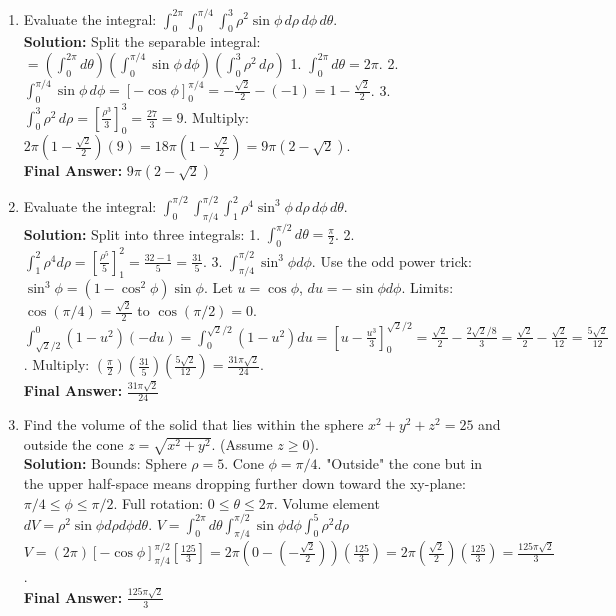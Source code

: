 \documentclass[11pt]{article}
\begin{document}
\begin{enumerate}[label=\textbf{\arabic*.}]
\item Evaluate the integral: $\int_0^{2\pi} \int_0^{\pi/4} \int_0^3 \rho^2 \sin\phi \, d\rho \, d\phi \, d\theta$.\\
\textbf{Solution:} Split the separable integral:
$= \left( \int_0^{2\pi} d\theta \right) \left( \int_0^{\pi/4} \sin\phi \, d\phi \right) \left( \int_0^3 \rho^2 \, d\rho \right)$
1. $\int_0^{2\pi} d\theta = 2\pi$.
2. $\int_0^{\pi/4} \sin\phi \, d\phi = [-\cos\phi]_0^{\pi/4} = -\frac{\sqrt{2}}{2} - (-1) = 1 - \frac{\sqrt{2}}{2}$.
3. $\int_0^3 \rho^2 \, d\rho = [\frac{\rho^3}{3}]_0^3 = \frac{27}{3} = 9$.
Multiply: $2\pi \left(1 - \frac{\sqrt{2}}{2}\right) (9) = 18\pi(1 - \frac{\sqrt{2}}{2}) = 9\pi(2-\sqrt{2})$.\\
\textbf{Final Answer:} $9\pi(2-\sqrt{2})$

\item Evaluate the integral: $\int_0^{\pi/2} \int_{\pi/4}^{\pi/2} \int_1^2 \rho^4 \sin^3\phi \, d\rho \, d\phi \, d\theta$.\\
\textbf{Solution:} Split into three integrals:
1. $\int_0^{\pi/2} d\theta = \frac{\pi}{2}$.
2. $\int_1^2 \rho^4 d\rho = [\frac{\rho^5}{5}]_1^2 = \frac{32-1}{5} = \frac{31}{5}$.
3. $\int_{\pi/4}^{\pi/2} \sin^3\phi d\phi$. Use the odd power trick: $\sin^3\phi = (1-\cos^2\phi)\sin\phi$. Let $u=\cos\phi$, $du=-\sin\phi d\phi$. Limits: $\cos(\pi/4) = \frac{\sqrt{2}}{2}$ to $\cos(\pi/2) = 0$.
$\int_{\sqrt{2}/2}^0 (1-u^2)(-du) = \int_0^{\sqrt{2}/2} (1-u^2)du = [u - \frac{u^3}{3}]_0^{\sqrt{2}/2} = \frac{\sqrt{2}}{2} - \frac{2\sqrt{2}/8}{3} = \frac{\sqrt{2}}{2} - \frac{\sqrt{2}}{12} = \frac{5\sqrt{2}}{12}$.
Multiply: $(\frac{\pi}{2}) (\frac{31}{5}) (\frac{5\sqrt{2}}{12}) = \frac{31\pi\sqrt{2}}{24}$.\\
\textbf{Final Answer:} $\frac{31\pi\sqrt{2}}{24}$

\item Find the volume of the solid that lies within the sphere $x^2+y^2+z^2=25$ and outside the cone $z=\sqrt{x^2+y^2}$. (Assume $z \ge 0$).\\
\textbf{Solution:} 
Bounds: Sphere $\rho = 5$. Cone $\phi = \pi/4$. "Outside" the cone but in the upper half-space means dropping further down toward the xy-plane: $\pi/4 \le \phi \le \pi/2$. Full rotation: $0 \le \theta \le 2\pi$. Volume element $dV = \rho^2\sin\phi d\rho d\phi d\theta$.
$V = \int_0^{2\pi} d\theta \int_{\pi/4}^{\pi/2} \sin\phi d\phi \int_0^5 \rho^2 d\rho$
$V = (2\pi) [-\cos\phi]_{\pi/4}^{\pi/2} [\frac{125}{3}] = 2\pi (0 - (-\frac{\sqrt{2}}{2})) (\frac{125}{3}) = 2\pi (\frac{\sqrt{2}}{2}) (\frac{125}{3}) = \frac{125\pi\sqrt{2}}{3}$.\\
\textbf{Final Answer:} $\frac{125\pi\sqrt{2}}{3}$


\end{enumerate}
\end{document}
